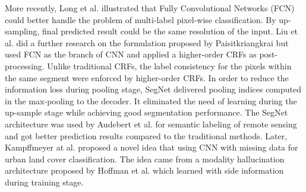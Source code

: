 More recently, Long et al. \cite{IEEEexample:Long_2015_CVPR} illustrated that Fully Convolutional Networks (FCN) could better handle the problem of multi-label pixel-wise classification. By up-sampling, final predicted result could be the same resolution of the input. Liu et al. \cite{IEEEexample:liu2017dense} did a further research on the formulation proposed by Paisitkriangkrai \cite{IEEEexample:paisitkriangkrai2015effective} but used FCN as the branch of CNN and applied a higher-order CRFs as post-processing. Unlike traditional CRFs, the label consistency for the pixels within the same segment were enforced by higher-order CRFs. In order to reduce the information loss during pooling stage, SegNet \cite{IEEEexample:badrinarayanan2017segnet} delivered pooling indices computed in the max-pooling to the decoder. It eliminated the need of learning during the up-sample stage while achieving good segmentation performance. The SegNet architecture was used by Audebert et al. \cite{IEEEexample:audebert2017deep} for semantic labeling of remote sensing and got better prediction results compared to the traditional methods. Later, Kampffmeyer at al. \cite{IEEEexample:kampffmeyer2017urban} proposed a novel idea that using CNN with missing data for urban land cover classification. The idea came from a modality hallucination architecture proposed by Hoffman et al. \cite{IEEEexample:hoffman2016learning} which learned with side information during training stage.


